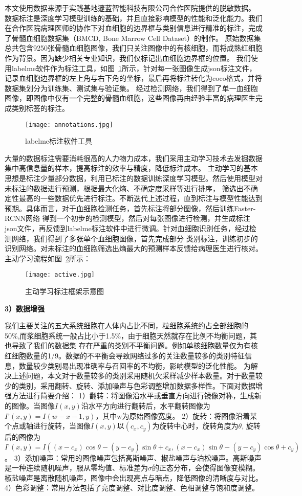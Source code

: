 本文使用数据来源于实践基地邃蓝智能科技有限公司合作医院提供的脱敏数据。
数据标注是深度学习模型训练的基础，并且直接影响模型的性能和泛化能力。我们在合作医院病理医师的协作下对血细胞的边界框与类别信息进行精准的标注，完成了骨髓血细胞数据集（BMCD, Bone Marrow Cell Dataset）的制作。
原始数据集总共包含9250张骨髓血细胞图像，我们只关注图像中的有核细胞，而将成熟红细胞作为背景。因为缺少相关专业知识，我们仅标记出血细胞边界框的位置。
我们使用labelme软件作为标注工具，如图~\ref{fig:annotations}所示，针对每一张图像生成json标注文件，记录血细胞边界框的左上角与右下角的坐标，最后再将标注转化为coco格式，并将数据集划分为训练集、测试集与验证集。
经过检测网络，我们得到了单一血细胞图像，即图像中仅有一个完整的骨髓血细胞，这些图像再由经验丰富的病理医生完成类别标签的标注。

\begin{figure}
  \centering
  \texttt{[image: annotations.jpg]}
  \caption{labelme标注软件工具}
  \label{fig:annotations}
\end{figure}

大量的数据标注需要消耗很高的人力物力成本，我们采用主动学习技术去发掘数据集中高信息量的样本，提高标注的效率与精度，降低标注成本。
主动学习的基本思想是标注少量部分数据，利用已标注的数据训练深度学习模型。然后使用模型对未标注的数据进行预测，根据最大化熵、不确定度采样等进行排序，
筛选出不确定性最高的一些数据优先进行标注。不断迭代上述过程，直到标注与模型性能达到预期。具体而言，对于血细胞检测任务，首先标注将部分图像，然后训练Faster-RCNN网络
得到一个初步的检测模型，然后对每张图像进行检测，并生成标注json文件，再反馈到labelme标注软件中进行微调。针对血细胞识别任务，经过检测网络，我们得到了多张单个血细胞图像，首先完成部分
类别标注，训练初步的识别网络。对未标注的血细胞筛选出熵最大的预测样本反馈给病理医生进行核对。主动学习流程如图~\ref{fig:active}所示：

\begin{figure}
  \centering
  \texttt{[image: active.jpg]}
  \caption{主动学习标注框架示意图}
  \label{fig:active}
\end{figure}
\textbf{3）数据增强}

我们主要关注的五大系统细胞在人体内占比不同，粒细胞系统约占全部细胞的50\%,而浆细胞系统一般占比小于1.5\%，由于细胞天然就存在比例不均衡问题，其也导致了我们的数据集
存在严重的类别不平衡问题。例如单核细胞数量仅为有核红细胞数量的1/9。数据的不平衡会导致网络过多的关注数量较多的类别特征信息，数量较少类别易出现准确率与召回率的不均衡，影响模型的泛化性能。
为解决上述问题，本文对于数量较多的类别采用随机欠采样减少样本数量。对于数量较少的类别，采用翻转、旋转、添加噪声与色彩调整增加数据多样性。下面对数据增强方法进行简要介绍：
1）翻转：将图像沿水平或垂直方向进行镜像对称，生成新的图像。当图像$I(x,y)$沿水平方向进行翻转后，水平翻转图像为$I’(x, y)=I(w-x-1,y)$，其中w为原始图像宽度。
2）旋转：将图像沿着某个点或轴进行旋转，当图像$I(x,y)$以$(c_x, c_y)$为旋转中心时，旋转角度为$\theta$, 旋转后的图像为$I’(x, y)=I((x - c_x)\cos\theta - (y - c_y)\sin\theta + c_x, (x - c_x)\sin\theta - (y - c_y)\cos\theta + c_y)$。
3）添加噪声：常用的图像噪声包括高斯噪声、椒盐噪声与泊松噪声。高斯噪声是一种连续随机噪声，服从零均值、标准差为$\sigma$的正态分布，会使得图像变模糊。
椒盐噪声是离散随机噪声，图像中会出现亮点与暗点，降低图像的清晰度与对比。
4）色彩调整：常用方法包括了亮度调整、对比度调整、色相调整与饱和度调整。

